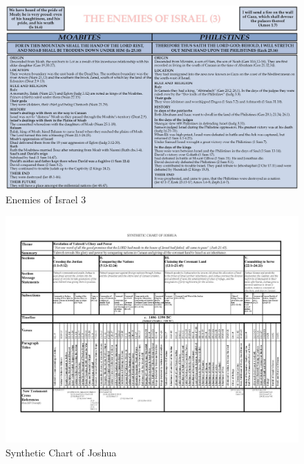 \newpage
\begin{figure}
\begin{center}
\includegraphics[scale=0.4, angle=90]{06OT-Joshua/References/5.EnemiesOfIsrael3.jpg}
\caption[Enemies of Israel 3]{Enemies of Israel 3}
\label{fig:Enemies of Israel 3}
\end{center}
\end{figure}

\newpage
\begin{figure}
\begin{center}
\includegraphics[scale=.4, angle=90]{06OT-Joshua/References/6.SyntheticChartofJoshua.jpg}
\caption[Synthetic Chart of Joshua]{Synthetic Chart of Joshua}
\label{fig:Synthetic Chart of Joshua}
\end{center}
\end{figure}


